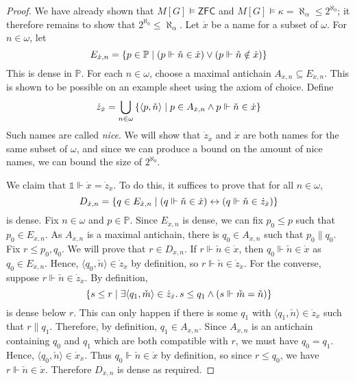\begin{proof}
    We have already shown that \( M[G] \vDash \mathsf{ZFC} \) and \( M[G] \vDash \kappa = \aleph_\alpha \leq 2^{\aleph_0} \); it therefore remains to show that \( 2^{\aleph_0} \leq \aleph_\alpha \).
    Let \( \dot x \) be a name for a subset of \( \omega \).
    For \( n \in \omega \), let
    \[ E_{\dot x, n} = \qty{p \in \mathbb P \mid (p \Vdash \check n \in \dot x) \vee (p \Vdash \check n \notin \dot x)} \]
    This is dense in \( \mathbb P \).
    For each \( n \in \omega \), choose a maximal antichain \( A_{\dot x, n} \subseteq E_{\dot x, n} \).
    This is shown to be possible on an example sheet using the axiom of choice.
    Define
    \[ \dot z_{\dot x} = \bigcup_{n \in \omega} \qty{\langle p, \check n \rangle \mid p \in A_{\dot x, n} \wedge p \Vdash \check n \in \dot x} \]
    Such names are called \emph{nice}.
    We will show that \( \dot z_{\dot x} \) and \( \dot x \) are both names for the same subset of \( \omega \), and since we can produce a bound on the amount of nice names, we can bound the size of \( 2^{\aleph_0} \).

    We claim that \( \Bbbone \Vdash \dot x = \dot z_{\dot x} \).
    To do this, it suffices to prove that for all \( n \in \omega \),
    \[ D_{\dot x, n} = \qty{q \in E_{\dot x, n} \mid (q \Vdash \check n \in \dot x) \leftrightarrow (q \Vdash \check n \in \dot z_{\dot x})} \]
    is dense.
    Fix \( n \in \omega \) and \( p \in \mathbb P \).
    Since \( E_{\dot x, n} \) is dense, we can fix \( p_0 \leq p \) such that \( p_0 \in E_{\dot x, n} \).
    As \( A_{\dot x, n} \) is a maximal antichain, there is \( q_0 \in A_{\dot x, n} \) such that \( p_0 \mathrel\| q_0 \).
    Fix \( r \leq p_0, q_0 \).
    We will prove that \( r \in D_{\dot x, n} \).
    If \( r \Vdash \check n \in \dot x \), then \( q_0 \Vdash \check n \in \dot x \) as \( q_0 \in E_{\dot x, n} \).
    Hence, \( \langle q_0, \check n \rangle \in \dot z_{\dot x} \) by definition, so \( r \Vdash \check n \in \dot z_{\dot x} \).
    For the converse, suppose \( r \Vdash \check n \in \dot z_{\dot x} \).
    By definition,
    \[ \qty{s \leq r \mid \exists \langle q_1, \check m \rangle \in \dot z_{\dot x}.\, s \leq q_1 \wedge (s \Vdash \check m = \check n)} \]
    is dense below \( r \).
    This can only happen if there is some \( q_1 \) with \( \langle q_1, \check n \rangle \in \dot z_{\dot x} \) such that \( r \mathrel\| q_1 \).
    Therefore, by definition, \( q_1 \in A_{\dot x, n} \).
    Since \( A_{\dot x, n} \) is an antichain containing \( q_0 \) and \( q_1 \) which are both compatible with \( r \), we must have \( q_0 = q_1 \).
    Hence, \( \langle q_0, \check n \rangle \in \dot x_{\dot x} \).
    Thus \( q_0 \Vdash \check n \in \dot x \) by definition, so since \( r \leq q_0 \), we have \( r \Vdash \check n \in \dot x \).
    Therefore \( D_{\dot x, n} \) is dense as required.


\end{proof}

